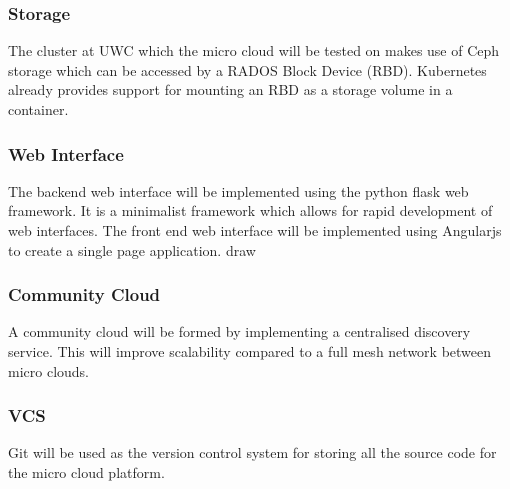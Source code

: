 \documentclass{sig-alternate-05-2015}
\begin{document}
\subsubsection{Storage}
The cluster at UWC which the micro cloud will be tested on makes use of Ceph storage which can be accessed by a RADOS Block Device (RBD). Kubernetes already provides support for mounting an RBD as a storage volume in a container.

\subsubsection{Web Interface}
The backend web interface will be implemented using the python flask web framework. It is a minimalist framework which allows for rapid development of web interfaces. 
The front end web interface will be implemented using Angularjs to create a single page application. 
draw
\subsubsection{Community Cloud}
A community cloud will be formed by implementing a centralised discovery service. This will improve scalability compared to a full mesh network between micro clouds.

\subsubsection{VCS}
Git will be used as the version control system for storing all the source code for the micro cloud platform.



 
\end{document}
